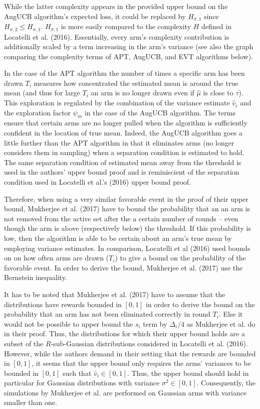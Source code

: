 \documentclass[11pt,]{article}
\begin{document}
While the latter complexity appears in the provided upper bound on the
AugUCB algorithm's expected loss, it could be replaced by
\(H_{\sigma, 1}\) since \(H_{\sigma, 2} \leq H_{\sigma,1}\).
\(H_{\sigma,1}\) is more easily compared to the complexity \(H\) defined
in Locatelli et al. (2016). Essentially, every arm's complexity
contribution is additionally scaled by a term increasing in the arm's
variance (see also the graph comparing the complexity terms of APT,
AugUCB, and EVT algorithms below).

In the case of the APT algorithm the number of times a specific arm has
been drawn \(T_i\) measures how concentrated the estimated mean is
around the true mean (and thus for large \(T_i\) an arm is no longer
drawn even if \(\hat{\mu}\) is close to \(\tau\)). This exploration is
regulated by the combination of the variance estimate \(\hat{v}_i\) and
the exploration factor \(\psi_m\) in the case of the AugUCB algorithm.
The terms ensure that certain arms are no longer pulled when the
algorithm is sufficiently confident in the location of true mean.
Indeed, the AugUCB algorithm goes a little further than the APT
algorithm in that it eliminates arms (no longer considers them in
sampling) when a separation condition is estimated to hold. The same
separation condition of estimated mean away from the threshold is used
in the authors' upper bound proof and is reminiscient of the separation
condition used in Locatelli et al.'s (2016) upper bound proof.

Therefore, when using a very similar favorable event in the proof of
their upper bound, Mukherjee et al. (2017) have to bound the probability
that an an arm is not removed from the active set after the a certain
number of rounds -- even though the arm is above (respectively below)
the threshold. If this probability is low, then the algorithm is able to
be certain about an arm's true mean by employing variance estimates. In
comparison, Locatelli et al (2016) used bounds on on how often arms are
drawn (\(T_i\)) to give a bound on the probability of the favorable
event. In order to derive the bound, Mukherjee et al. (2017) use the
Bernstein inequality.

It has to be noted that Mukherjee et al. (2017) have to assume that the
distributions have rewards bounded in \([0,1]\) in order to derive the
bound on the probability that an arm has not been eliminated correctly
in round \(T_i\). Else it would not be possible to upper bound the
\(s_i\) term by \(\Delta_i/4\) as Mukherjee et al. do in their proof.
Thus, the distributions for which their upper bound holds are a subset
of the \(R\)-sub-Gaussian distributions considered in Locatelli et al.
(2016). However, while the authors demand in their setting that the
rewards are bounded in \([0,1]\), it seems that the upper bound only
requires the arms' variances to be bounded in \([0,1]\) such that
\(\hat{v}_i \in [0,1]\). Thus, the upper bound should hold in particular
for Gaussian distributions with variance \(\sigma^2 \in [0,1]\).
Consequently, the simulations by Mukherjee et al. are performed on
Gaussian arms with variance smaller than one.
\end{document}
